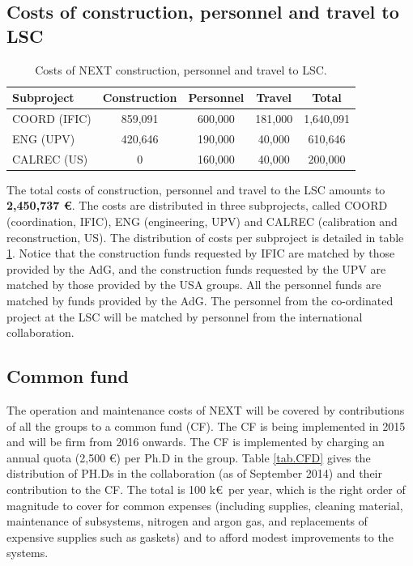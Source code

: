 \documentclass[a4paper,11pt,oneside]{article}
\begin{document}
\subsection{Costs of construction, personnel and travel to LSC}
\begin{table}[h!]
\begin{center}
\begin{tabular}{|l|c|c|c|c|}
\hline
Subproject &	Construction &	Personnel  &	Travel& Total\\
\hline
COORD (IFIC)	& 859,091 &	600,000 &	181,000 &	1,640,091 \\
ENG (UPV)	& 420,646 &	190,000	& 40,000	& 610,646 \\
CALREC (US)	& 0	& 160,000	 & 40,000	& 200,000 \\
 \hline\hline
\end{tabular}  
\caption{Costs of NEXT construction, personnel and travel to LSC.}
\label{tab.CostsTotal}
\end{center}
\end{table} 

The total costs of construction, personnel and travel to the LSC amounts to 
{\bf 2,450,737 \euro}. The costs are distributed in three subprojects, called COORD (coordination, IFIC), 
ENG (engineering, UPV) and CALREC (calibration and reconstruction, US). The distribution of costs per subproject is detailed in table \ref{tab.CostsTotal}. Notice that the construction funds requested
by IFIC are matched by those provided by the AdG, and the construction funds requested by the 
UPV are matched by those provided by the USA groups. All the personnel funds are matched by 
funds provided by the AdG. The personnel from the co-ordinated project at the LSC will be matched
by personnel from the international collaboration. 

\subsection{Common fund}

The operation and maintenance costs of NEXT will be covered by contributions of all the groups to a common fund (CF). The CF is being implemented in 2015 and will be firm from 2016 onwards. The CF is implemented by charging an annual quota (2,500 \euro) per Ph.D in the group. Table \ref{tab.CFD} gives the distribution of PH.Ds in the collaboration (as of September 2014) and their contribution to the CF. The total is 100 k\euro\ per year, which is the right order of magnitude to cover for common expenses (including supplies, cleaning material, maintenance of subsystems, nitrogen and argon gas, and replacements of expensive supplies such as gaskets) and to afford modest improvements to the systems. 
\end{document}

